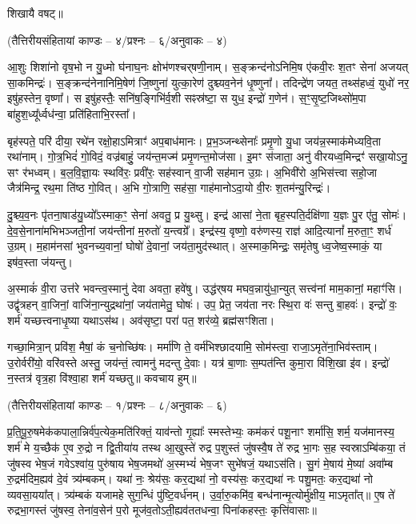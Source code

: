 शिखायै वषट्॥

{\small\closesection}

\centerline{\scriptsize (तैत्तिरीयसंहितायां काण्डः – ४/प्रश्नः – ६/अनुवाकः – ४)}

आ॒शुः शिशा॑नो वृष॒भो न यु॒ध्मो घ॑नाघ॒नः क्षोभ॑णश्चर्‌षणी॒नाम्। स॒ङ्क्रन्द॑नो\-ऽनिमि॒ष ए॑कवी॒रः श॒तꣳ सेना॑ अजयत् सा॒कमिन्द्रः॑। स॒ङ्क्रन्द॑नेना\-निमि॒षेण॑ जि॒ष्णुना॑ युत्का॒रेण॑ दुश्च्यव॒नेन॑ धृ॒ष्णुना᳚। तदिन्द्रे॑ण जयत॒ तथ्स॑हध्वं॒ युधो॑ नर॒ इषु॑हस्तेन॒ वृष्णा᳚। स इषु॑हस्तैः॒ सनि॑ष॒ङ्गिभि॑र्व॒शी सꣴस्र॑ष्टा॒ स युध॒ इन्द्रो॑ ग॒णेन॑। स॒ꣳ॒सृ॒ष्ट॒जिथ्सो॑म॒पा बा॑हुश॒ध्यू᳚र्ध्वध॑न्वा॒ प्रति॑हिताभि॒रस्ता᳚।

बृह॑स्पते॒ परि॑ दीया॒ रथे॑न रक्षो॒हाऽमित्राꣳ॑ अप॒बाध॑मानः। प्र॒भ॒ञ्जन्थ्सेनाः᳚ प्रमृ॒णो यु॒धा जय॑न्न॒स्माक॑मेध्यवि॒ता रथा॑नाम्। गो॒त्र॒भिदं॑ गो॒विदं॒ वज्र॑बाहुं॒ जय॑न्त॒मज्म॑ प्रमृ॒णन्त॒मोज॑सा। इ॒मꣳ स॑जाता॒ अनु॑ वीरयध्व॒मिन्द्रꣳ॑ सखा॒योऽनु॒ सꣳ र॑भध्वम्। ब॒ल॒वि॒ज्ञा॒यः स्थवि॑रः॒ प्रवी॑रः॒ सह॑स्वान् वा॒जी सह॑मान उ॒ग्रः। अ॒भिवी॑रो अ॒भिस॑त्त्वा सहो॒जा जैत्र॑मिन्द्र॒ रथ॒मा ति॑ष्ठ गो॒वित्। अ॒भि गो॒त्राणि॒ सह॑सा॒ गाह॑मानोऽदा॒यो वी॒रः श॒तम॑न्यु॒रिन्द्रः॑।

दु॒श्च्य॒व॒नः पृ॑तना॒षाड॑यु॒ध्यो᳚\-ऽस्माक॒ꣳ॒ सेना॑ अवतु॒ प्र यु॒थ्सु। इन्द्र॑ आसां ने॒ता बृह॒स्पति॒र्दक्षि॑णा य॒ज्ञः पु॒र ए॑तु॒ सोमः॑। दे॒व॒से॒नाना॑मभिभञ्जती॒नां जय॑न्तीनां म॒रुतो॑ य॒न्त्वग्रे᳚। इन्द्र॑स्य॒ वृष्णो॒ वरु॑णस्य॒ राज्ञ॑ आदि॒त्यानां᳚ म॒रुता॒ꣳ॒ शर्ध॑ उ॒ग्रम्। म॒हाम॑नसां भुवनच्य॒वानां॒ घोषो॑ दे॒वानां॒ जय॑ता॒मुद॑स्थात्। अ॒स्माक॒मिन्द्रः॒ समृ॑तेषु ध्व॒जेष्व॒स्माकं॒ या इष॑व॒स्ता ज॑यन्तु।

अ॒स्माकं॑ वी॒रा उत्त॑रे भवन्त्व॒स्मानु॑ देवा अवता॒ हवे॑षु। उद्ध॑र्‌षय मघव॒न्नायु॑धा॒न्युत् सत्त्व॑नां माम॒कानां॒ महाꣳ॑सि। उद्वृ॑त्रहन् वा॒जिनां॒ वाजि॑ना॒न्युद्रथा॑नां॒ जय॑तामेतु॒ घोषः॑। उप॒ प्रेत॒ जय॑ता नरः स्थि॒रा वः॑ सन्तु बा॒हवः॑। इन्द्रो॑ वः॒ शर्म॑ यच्छत्त्वनाधृ॒ष्या यथाऽस॑थ। अव॑सृष्टा॒ परा॑ पत॒ शर॑व्ये॒ ब्रह्म॑सꣳशिता।

गच्छा॒मित्रा॒न् प्रवि॑श॒ मैषां॒ कं च॒नोच्छि॑षः। मर्मा॑णि ते॒ वर्म॑भिश्छादयामि॒ सोम॑स्त्वा॒ राजा॒ऽमृते॑ना॒भिव॑स्ताम्। उ॒रोर्वरी॑यो॒ वरि॑वस्ते अस्तु॒ जय॑न्तं॒ त्वामनु॑ मदन्तु दे॒वाः। यत्र॑ बा॒णाः स॒म्पत॑न्ति कुमा॒रा वि॑शि॒खा इ॑व। इन्द्रो॑ न॒स्तत्र॑ वृत्र॒हा वि॑श्वा॒हा शर्म॑ यच्छतु॥
कवचाय हुम्॥

{\small\closesection}

\centerline{\scriptsize (तैत्तिरीयसंहितायां काण्डः – १/प्रश्नः – ८/अनुवाकः – ६)}

प्र॒ति॒पू॒रु॒षमेक॑कपाला॒न्निर्व॑प॒त्येक॒मति॑रिक्तं॒ याव॑न्तो गृ॒ह्याः᳚ स्मस्तेभ्यः॒ कम॑करं पशू॒नाꣳ शर्मा॑सि॒ शर्म॒ यज॑मानस्य॒ शर्म॑ मे य॒च्छैक॑ ए॒व रु॒द्रो न द्वि॒तीया॑य तस्थ आ॒खुस्ते॑ रुद्र प॒शुस्तं जु॑षस्वै॒ष ते॑ रुद्र भा॒गः स॒ह स्वस्राऽम्बि॑कया॒ तं जु॑षस्व भेष॒जं गवेऽश्वा॑य॒ पुरु॑षाय भेष॒जमथो॑ अ॒स्मभ्यं॑ भेष॒जꣳ सुभे॑षजं॒ यथाऽस॑ति। सु॒गं मे॒षाय॑ मे॒ष्या॑ अवा᳚म्ब रु॒द्रम॑दिम॒ह्यव॑ दे॒वं त्र्य॑म्बकम्। यथा॑ नः॒ श्रेय॑सः॒ कर॒द्यथा॑ नो॒ वस्य॑सः॒ कर॒द्यथा॑ नः पशु॒मतः॒ कर॒द्यथा॑ नो व्यवसा॒यया᳚त्। त्र्य॑म्बकं यजामहे सुग॒न्धिं पु॑ष्टि॒वर्ध॑नम्। उ॒र्वा॒रु॒कमि॑व॒ बन्ध॑नान्मृ॒त्योर्मु॑क्षीय॒ माऽमृता᳚त्॥ ए॒ष ते॑ रुद्रभा॒गस्तं जु॑षस्व॒ तेना॑व॒सेन॑ प॒रो मूज॑व॒तोऽती॒ह्यव॑ततधन्वा॒ पिना॑कहस्तः॒ कृत्ति॑वासाः॥


